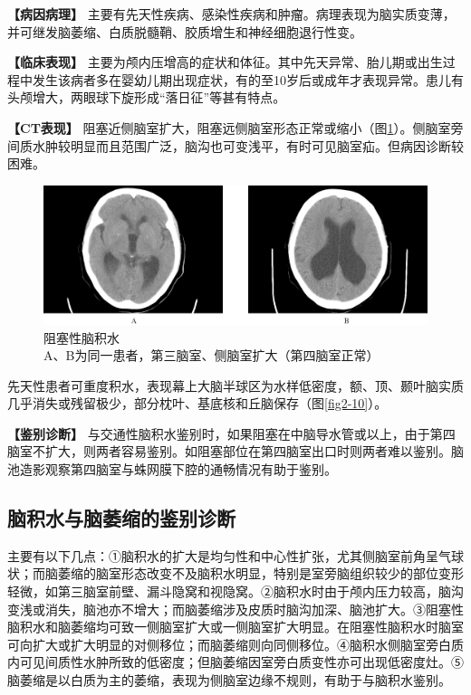 \textbf{【病因病理】}
主要有先天性疾病、感染性疾病和肿瘤。病理表现为脑实质变薄，并可继发脑萎缩、白质脱髓鞘、胶质增生和神经细胞退行性变。

\textbf{【临床表现】}
主要为颅内压增高的症状和体征。其中先天异常、胎儿期或出生过程中发生该病者多在婴幼儿期出现症状，有的至10岁后或成年才表现异常。患儿有头颅增大，两眼球下旋形成“落日征”等甚有特点。

\textbf{【CT表现】}
阻塞近侧脑室扩大，阻塞远侧脑室形态正常或缩小（图\ref{fig2-18}）。侧脑室旁间质水肿较明显而且范围广泛，脑沟也可变浅平，有时可见脑室疝。但病因诊断较困难。

\begin{figure}[!htbp]
 {\centering
 \includegraphics[width=.7\textwidth,height=\textheight,keepaspectratio]{./images/Image00034.jpg}
 \captionsetup{justification=centering}
 \caption{阻塞性脑积水\\{\small  A、B为同一患者，第三脑室、侧脑室扩大（第四脑室正常）}}
 \label{fig2-18}}
  \end{figure} 



先天性患者可重度积水，表现幕上大脑半球区为水样低密度，额、顶、颞叶脑实质几乎消失或残留极少，部分枕叶、基底核和丘脑保存（图\ref{fig2-10}）。

\textbf{【鉴别诊断】}
与交通性脑积水鉴别时，如果阻塞在中脑导水管或以上，由于第四脑室不扩大，则两者容易鉴别。如阻塞部位在第四脑室出口时则两者难以鉴别。脑池造影观察第四脑室与蛛网膜下腔的通畅情况有助于鉴别。

\subsection{脑积水与脑萎缩的鉴别诊断}

主要有以下几点：①脑积水的扩大是均匀性和中心性扩张，尤其侧脑室前角呈气球状；而脑萎缩的脑室形态改变不及脑积水明显，特别是室旁脑组织较少的部位变形轻微，如第三脑室前壁、漏斗隐窝和视隐窝。②脑积水时由于颅内压力较高，脑沟变浅或消失，脑池亦不增大；而脑萎缩涉及皮质时脑沟加深、脑池扩大。③阻塞性脑积水和脑萎缩均可致一侧脑室扩大或一侧脑室扩大明显。在阻塞性脑积水时脑室可向扩大或扩大明显的对侧移位；而脑萎缩则向同侧移位。④脑积水侧脑室旁白质内可见间质性水肿所致的低密度；但脑萎缩因室旁白质变性亦可出现低密度灶。⑤脑萎缩是以白质为主的萎缩，表现为侧脑室边缘不规则，有助于与脑积水鉴别。


